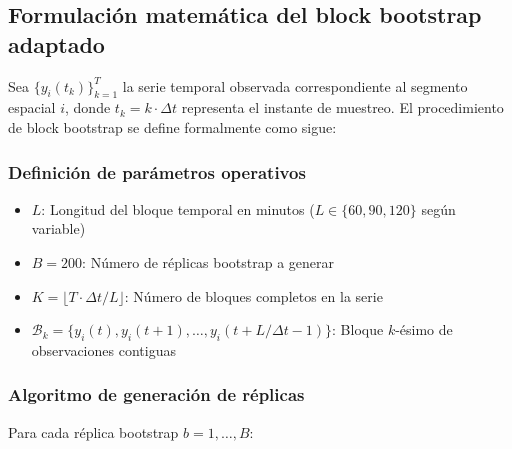 \documentclass[
  spanish,
  us-letterpaper,
]{scrreprt}
\providecommand{\tightlist}{%
  \setlength{\itemsep}{0pt}\setlength{\parskip}{0pt}}
\numberwithin{equation}{section}
\begin{document}
\subsection{Formulación matemática del block bootstrap
adaptado}\label{formulaciuxf3n-matemuxe1tica-del-block-bootstrap-adaptado}

Sea \(\{y_i(t_k)\}_{k=1}^T\) la serie temporal observada correspondiente
al segmento espacial \(i\), donde \(t_k = k \cdot \Delta t\) representa
el instante de muestreo. El procedimiento de block bootstrap se define
formalmente como sigue:

\subsubsection{Definición de parámetros
operativos}\label{definiciuxf3n-de-paruxe1metros-operativos}

\begin{itemize}
\tightlist
\item
  \(L\): Longitud del bloque temporal en minutos
  (\(L \in \{60, 90, 120\}\) según variable)
\item
  \(B = 200\): Número de réplicas bootstrap a generar
\item
  \(K = \lfloor T \cdot \Delta t / L \rfloor\): Número de bloques
  completos en la serie
\item
  \(\mathcal{B}_k = \{y_i(t), y_i(t+1), \dots, y_i(t+L/\Delta t-1)\}\):
  Bloque \(k\)-ésimo de observaciones contiguas
\end{itemize}

\subsubsection{Algoritmo de generación de
réplicas}\label{algoritmo-de-generaciuxf3n-de-ruxe9plicas}

Para cada réplica bootstrap \(b = 1, \dots, B\):
\end{document}
